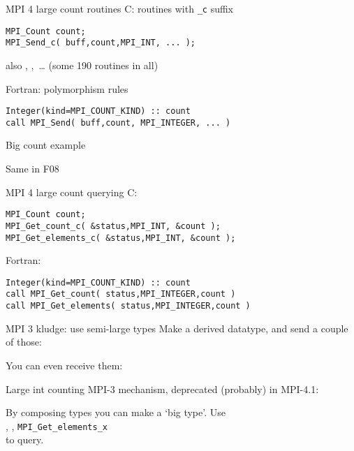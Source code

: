 \begin{numberedframe}{MPI 4 large count routines}
C: routines with \lstinline+_c+ suffix
\begin{lstlisting}
MPI_Count count;
MPI_Send_c( buff,count,MPI_INT, ... );
\end{lstlisting}
\lstset{language=Fortran}
also , ,~\ldots
(some 190 routines in all)

Fortran: polymorphism rules
\begin{lstlisting}
Integer(kind=MPI_COUNT_KIND) :: count
call MPI_Send( buff,count, MPI_INTEGER, ... )
\end{lstlisting}
\lstset{language=C}
\end{numberedframe}

\begin{numberedframe}{Big count example}
\end{numberedframe}

\begin{numberedframe}{Same in F08}
\end{numberedframe}


\begin{numberedframe}{MPI 4 large count querying}
C: 
\begin{lstlisting}
MPI_Count count;
MPI_Get_count_c( &status,MPI_INT, &count );
MPI_Get_elements_c( &status,MPI_INT, &count );
\end{lstlisting}
\lstset{language=Fortran}
Fortran: 
\begin{lstlisting}
Integer(kind=MPI_COUNT_KIND) :: count
call MPI_Get_count( status,MPI_INTEGER,count )
call MPI_Get_elements( status,MPI_INTEGER,count )
\end{lstlisting}
\lstset{language=C}
\end{numberedframe}

\begin{numberedframe}{MPI 3 kludge: use semi-large types}
  Make a derived datatype, and send a couple of those:
  

  You can even receive them:

\end{numberedframe}

\begin{numberedframe}{Large int counting}
  MPI-3 mechanism, deprecated (probably) in MPI-4.1: 

  By composing types you can make a `big type'. Use\\
  ,
  ,
   \lstinline{MPI_Get_elements_x}\\
  to query.

\end{numberedframe}

